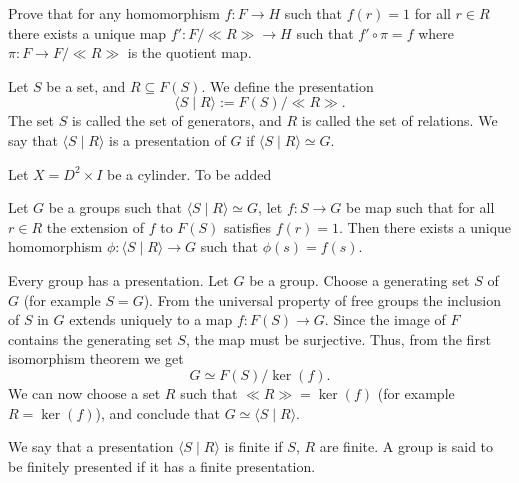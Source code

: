 \documentclass[11pt,a4paper]{article}
\begin{document}
\begin{exercise}
  Prove that for any homomorphism $f \colon F \to H$ such that
  $f(r) = 1$ for all $r \in R$ there exists a unique map
  $f' \colon F / \ll R \gg \to H$ such that $f' \circ \pi = f$
  where $\pi \colon F \to F / \ll R \gg$ is the quotient map.
\end{exercise}

\begin{definition}
  Let $S$ be a set, and $R \subseteq F(S)$.
  We define the presentation
  \[
    \langle S \mid R \rangle := F(S)/ \ll R \gg.
  \]
  The set $S$ is called the set of generators, and $R$ is called the set
  of relations.
  We say that $\langle S \mid R \rangle$ is a presentation of $G$
  if $\langle S \mid R \rangle \simeq G$.
\end{definition}

\begin{definition}
  Let $X = D^2 \times I$ be a cylinder.
  To be added
\end{definition}

\begin{exercise}
  Let $G$ be a groups such that $\langle S \mid R \rangle \simeq G$,
  let $f \colon S \to G$ be map such that for all $r \in R$ the extension
  of $f$ to $F(S)$ satisfies $f(r) = 1$.
  Then there exists a unique homomorphism
  $\phi \colon \langle S \mid R \rangle \to G$ such that
  $\phi(s) = f(s)$.
\end{exercise}

\begin{remark}
  Every group has a presentation.
  Let $G$ be a group.
  Choose a generating set $S$ of $G$ (for example $S = G$).
  From the universal property of free groups
  the inclusion of $S$ in $G$ extends uniquely to a map
  $f \colon F(S) \to G$.
  Since the image of $F$ contains the generating set $S$,
  the map must be surjective.
  Thus, from the first isomorphism theorem we get
  \[
    G \simeq F(S) / \ker(f).
  \]
  We can now choose a set $R$ such that $\ll R \gg = \ker(f)$
  (for example $R = \ker(f)$),
  and conclude that $G \simeq \langle S \mid R \rangle$.
\end{remark}

\begin{definition}
  We say that a presentation $\langle S \mid R \rangle$ is finite
  if $S$, $R$ are finite.
  A group is said to be finitely presented if it has a finite presentation.
\end{definition}
\end{document}
